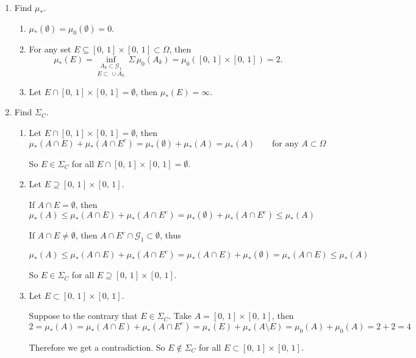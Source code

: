\documentclass[a4paper,11pt]{article}
\begin{document}
\begin{enumerate}
	\item Find $\mu_*$.
		\begin{enumerate}
			\item $\mu_*(\emptyset) = \mu_0(\emptyset) = 0$.\\


			\item For any set $E \subseteq [0,\,1] \times [0,\,1] \subset \Omega$, then
				$$\mu_*(E)
				= \underset{E \subset\,\cup A_k}{\underset{A_k \subset \mathcal{G}_1}{\inf}}\,\Sigma\,\mu_0(A_k)
				= \mu_0([0,\,1] \times [0,\,1])
				= 2.$$

			\item Let $E \cap [0,\,1] \times [0,\,1] = \emptyset$, then $\mu_*(E) = \infty$.\\
		\end{enumerate}

	\item Find $\Sigma_C$.
		\begin{enumerate}
			\item Let $E \cap [0,\,1] \times [0,\,1] = \emptyset$, then
				$$\mu_*(A \cap E) + \mu_*(A \cap E^c)
				= \mu_*(\emptyset) + \mu_*(A)
				= \mu_*(A)
				\quad \quad \text{for any }A \subset \Omega$$

				So $E \in \Sigma_C$ for all $E \cap [0,\,1] \times [0,\,1] = \emptyset$.\\

			\item Let $E \supseteq [0,\,1] \times [0,\,1]$.

				If $A \cap E = \emptyset$, then
				$$\mu_*(A)
				\leq \mu_*(A \cap E) + \mu_*(A \cap E^c)
				= \mu_*(\emptyset) + \mu_*(A \cap E^c)
				\leq \mu_*(A)$$

				If $A \cap E \neq \emptyset$, then $A \cap E^c \cap \mathcal{G}_1 \subset \emptyset$, thus

				$$\mu_*(A)
				\leq \mu_*(A \cap E) + \mu_*(A \cap E^c)
				= \mu_*(A \cap E) + \mu_*(\emptyset)
				= \mu_*(A \cap E)
				\leq \mu_*(A)$$

				So $E \in \Sigma_C$ for all $E \supseteq [0,\,1] \times [0,\,1]$.\\

			\item Let $E \subset [0,\,1] \times [0,\,1]$.

			Suppose to the contrary that $E \in \Sigma_C$. Take $A = [0,\,1] \times [0,\,1]$, then
				$$2 = \mu_*(A)
				= \mu_*(A \cap E) + \mu_*(A \cap E^c)
				= \mu_*(E) + \mu_*(A \setminus E)
				= \mu_0(A) + \mu_0(A)
				= 2 + 2 = 4$$

			Therefore we get a contradiction. So $E \notin \Sigma_C$ for all $E \subset [0,\,1] \times [0,\,1]$.\\\\
		\end{enumerate}
\end{enumerate}
\end{document}
